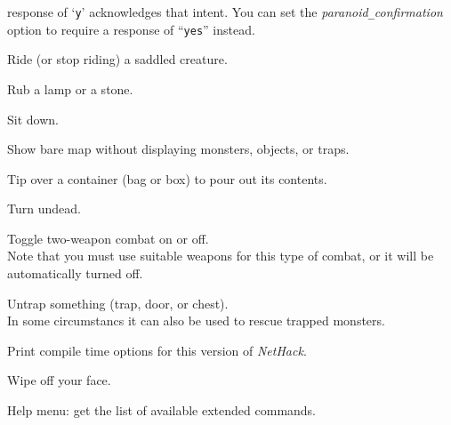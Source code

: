 response of `{\tt y}' acknowledges that intent.  You can set the
{\it paranoid\verb+_+confirmation\/}
option to require a response of ``{\tt yes}'' instead.
\item[\tb{\#ride}]
Ride (or stop riding) a saddled creature.
\item[\tb{\#rub}]
Rub a lamp or a stone.
\item[\tb{\#sit}]
Sit down.
\item[\tb{\#terrain}]
Show bare map without displaying monsters, objects, or traps.
\item[\tb{\#tip}]
Tip over a container (bag or box) to pour out its contents.
\item[\tb{\#turn}]
Turn undead.
\item[\tb{\#twoweapon}]
Toggle two-weapon combat on or off.\\
Note that you must
use suitable weapons for this type of combat, or it will
be automatically turned off.
\item[\tb{\#untrap}]
Untrap something (trap, door, or chest).\\
In some circumstancs it can also be used to rescue trapped monsters.
\item[\tb{\#version}]
Print compile time options for this version of {\it NetHack}.
\item[\tb{\#wipe}]
Wipe off your face.
\item[\tb{\#?}]
Help menu:  get the list of available extended commands.
\elist

